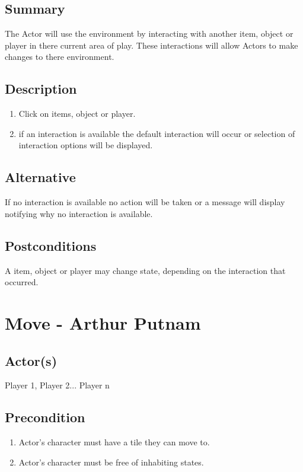 \documentclass[11pt]{article}
\begin{document}
		\subsection{Summary}
		The Actor will use the environment by interacting with another item, object or player in there current area of play. These interactions will allow Actors to make changes to there environment.
		\subsection{Description}
			\begin{enumerate}
			\item Click on items, object or player.
			\item if an interaction is available the default interaction will occur or selection of interaction options will be displayed.
			\end{enumerate}

		\subsection{Alternative}
			If no interaction is available no action will be taken or a message will display notifying why no interaction is available.
		\subsection{Postconditions}	
		A item, object or player may change state, depending on the interaction that occurred. 
		
		
		
		\maketitle

    \section{Move - Arthur Putnam}
	

		\subsection{Actor(s)}
		Player 1, Player 2... Player n
			

		\subsection{Precondition}
		\begin{enumerate}
		\item Actor's character must have a tile they can move to.
        \item Actor's character must be free of inhabiting states.  
		\end{enumerate}
	
\end{document}

